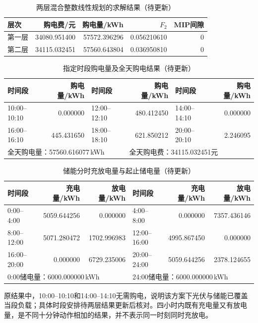 \documentclass[withoutpreface,bwprint]{cumcmthesis}
\begin{document}
\begin{table}[H]
 \centering\small
 \caption{两层混合整数线性规划的求解结果（待更新）}\label{tab:q1-stages}
 \begin{tabular}{lrrrr}
 \toprule
 层次&购电费/元&购电量/kWh&$F_2$&MIP间隙\\
 \midrule
 第一层&34080.951400&57572.396296&0.056210610&0\\
 第二层&34115.032451&57560.643804&0.036950810&0\\
 \bottomrule
 \end{tabular}
\end{table}

\begin{table}[H]
 \centering\small
 \caption{指定时段购电量及全天购电结果（待更新）}\label{tab:q1-purchase}
 \begin{tabular}{lrlrlr}
 \toprule
 时间段&购电量/kWh&时间段&购电量/kWh&时间段&购电量/kWh\\
 \midrule
 10:00--10:10&0.000000&12:00--12:10&480.412450&14:00--14:10&0.000000\\
 16:00--16:10&445.431650&18:00--18:10&621.850212&20:00--20:10&2.246095\\
 \midrule
 \multicolumn{3}{l}{全天购电量：57560.616077\,kWh}&
 \multicolumn{3}{l}{全天购电费：34115.032451元}\\
 \bottomrule
 \end{tabular}
\end{table}
\begin{table}[H]
 \centering\small
 \caption{储能分时充放电量与起止储电量（待更新）}\label{tab:q1-storage}
 \begin{tabular}{lrrlrr}
 \toprule
 时间段&充电量/kWh&放电量/kWh&时间段&充电量/kWh&放电量/kWh\\
 \midrule
 0:00--4:00&5059.644256&0.000000&4:00--8:00&0.000000&7357.436146\\
 8:00--12:00&5071.280472&1702.996983&12:00--16:00&4995.867450&0.000000\\
 16:00--20:00&0.000000&6729.235006&20:00--24:00&5059.644256&2378.124655\\
 \midrule
 \multicolumn{3}{l}{0:00储电量：6000.000000\,kWh}&
 \multicolumn{3}{l}{24:00储电量：6000.000000\,kWh}\\
 \bottomrule
 \end{tabular}
\end{table}
原结果中，10:00--10:10和14:00--14:10无需购电，说明该方案下光伏与储能已覆盖当段负载；具体时段安排待两层结果更新后核对。四小时内既有充电量又有放电量，是不同十分钟动作相加的结果，并不表示同一时刻同时充放电。
\end{document}
